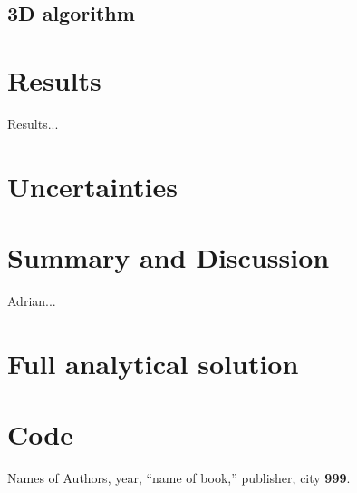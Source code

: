 \documentclass[aps,twocolumn,pre,nofootinbib]{revtex4}
\begin{document}
\subsection{3D algorithm}






\section{Results \label{sec:res}}


Results...


\section{Uncertainties \label{sec:unc}}




\section{Summary and Discussion \label{sec:sum}}


\begin{acknowledgments}
Adrian...
\end{acknowledgments}


\appendix*
\section{Full analytical solution}
\section{Code}




\begin{thebibliography}{5}

\bibitem[Reflabel]  Names of Authors, year, ``name of book,'' publisher, city {\bf 999}.


\end{thebibliography}
\end{document}
